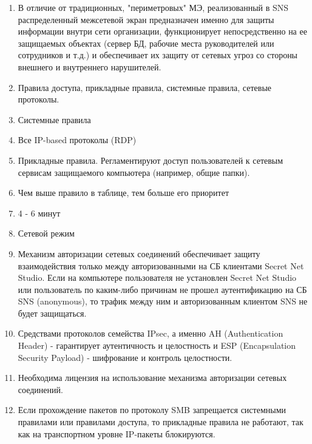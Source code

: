 \documentclass[a4paper,14pt]{extarticle}
\begin{document}
    \begin{enumerate}
        \singlespacing
        \item В отличие от традиционных, "периметровых" МЭ, реализованный в SNS \linebreak
        распределенный межсетевой экран предназначен именно для защиты \linebreak информации 
        внутри сети организации, функционирует непосредственно на ее защищаемых объектах 
        (сервер БД, рабочие места руководителей или сотрудников и т.д.) и обеспечивает 
        их защиту от сетевых угроз со стороны внешнего и внутреннего нарушителей.
        \item Правила доступа, прикладные правила, системные правила, сетевые протоколы.
        \item Системные правила
        \item Все IP-based протоколы (RDP)
        \item Прикладные правила. Регламентируют доступ пользователей к сетевым сервисам защищаемого компьютера (например, общие папки).
        \item Чем выше правило в таблице, тем больше его приоритет
        \item 4 - 6 минут
        \item Сетевой режим
        \item Механизм авторизации сетевых соединений обеспечивает защиту \linebreak взаимодействия только между авторизованными на СБ клиентами Secret Net Studio. Если на компьютере пользователя не установлен Secret Net Studio или пользователь по каким-либо причинам не прошел аутентификацию на СБ SNS (anonymous), то трафик между ним и авторизованным клиентом SNS не будет защищаться.
        \item Средствами протоколов семейства IPsec, а именно AH (Authentication Header) - гарантирует аутентичность и целостность и ESP (Encapsulation Security Payload) - шифрование и контроль целостности.
        \item Необходима лицензия на использование механизма авторизации сетевых \linebreak соединений.
        \item Если прохождение пакетов по протоколу SMB запрещается системными \linebreak правилами
        или правилами доступа, то прикладные правила не работают, так как на транспортном уровне IP-пакеты блокируются.
    \end{enumerate}
\end{document}
